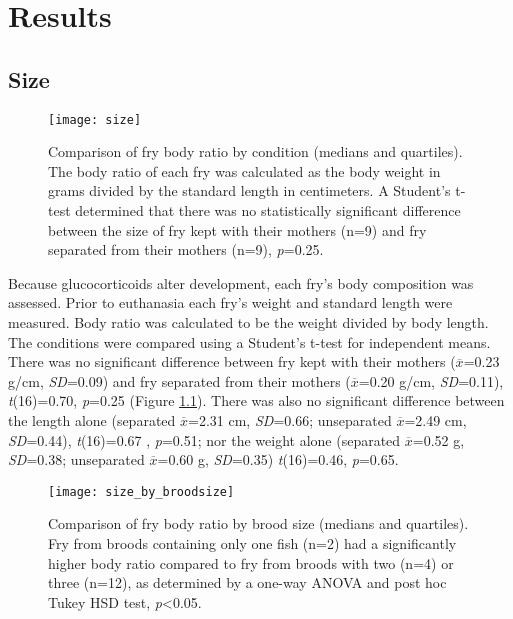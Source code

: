 \documentclass[12pt,twoside]{reedthesis}
\begin{document}
\chapter{Results}
\section{Size}

\begin{figure}[htbp] 
\begin{center} 
\texttt{[image: size]}
\caption[Comparison of fry body ratio by condition]{\footnotesize{Comparison of fry body
      ratio by condition (medians and quartiles). \\ The body ratio of each fry
    was calculated as the body weight in grams divided by the standard length in
    centimeters. A Student's t-test determined that there was no
    statistically significant difference between the size of fry kept with their
    mothers (n=9) and fry separated from their
  mothers (n=9), \textit{p}=0.25}.}
\label{size}
\end{center} 
\end{figure}

Because glucocorticoids alter development, each
fry's body
composition was assessed. Prior to euthanasia each fry's weight and standard length were measured. 
Body ratio was calculated to be the weight divided by body length. The conditions were
compared using a Student's t-test for independent means. There was no
significant difference between fry kept with their mothers ($\overline{x}$=0.23 g/cm,
\textit{SD}=0.09) and fry separated from their mothers ($\overline{x}$=0.20 g/cm,
\textit{SD}=0.11), \textit{t}(16)=0.70, \textit{p}=0.25 (Figure \ref{size}). There was also no
significant difference between the length alone (separated $\overline{x}$=2.31 cm,
\textit{SD}=0.66;
unseparated $\overline{x}$=2.49 cm, \textit{SD}=0.44), \textit{t}(16)=0.67
,
\textit{p}=0.51; nor the weight
alone (separated $\overline{x}$=0.52 g, \textit{SD}=0.38; unseparated $\overline{x}$=0.60 g, \textit{SD}=0.35) \textit{t}(16)=0.46, \textit{p}=0.65.

\begin{figure}[htbp] 
\begin{center} 
\texttt{[image: size\_by\_broodsize]}
\caption[Comparison of fry body ratio by brood size]{\footnotesize{Comparison of fry body
      ratio by brood size (medians and quartiles). \\ Fry from broods containing
      only one fish (n=2) had a significantly higher
body ratio compared to fry from broods with two (n=4) or three (n=12), as determined by a one-way ANOVA and post hoc Tukey HSD test, \textit{p}<0.05.}}
\label{broodsize}
\end{center} 
\end{figure}
\end{document}
